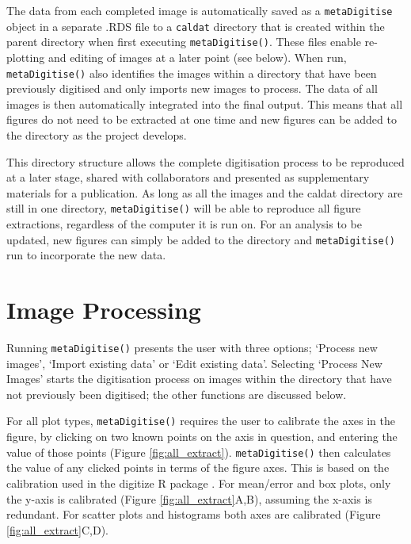 \documentclass[12pt]{article}
\newcommand{\code}[1]{\texttt{#1}}
\newcommand{\fct}[1]{\texttt{#1()}}
\newcommand{\pkg}[1]{{\fontseries{b}\selectfont #1}}
\begin{document}
The data from each completed image is automatically saved as a \code{metaDigitise} object in a separate .RDS file to a \code{caldat} directory that is created within the parent directory when first executing \fct{metaDigitise}. These files enable re-plotting and editing of images at a later point (see below). When run, \fct{metaDigitise} also identifies the images within a directory that have been previously digitised and only imports new images to process. The data of all images is then automatically integrated into the final output. This means that all figures do not need to be extracted at one time and new figures can be added to the directory as the project develops.

This directory structure allows the complete digitisation process to be reproduced at a later stage, shared with collaborators and presented as supplementary materials for a publication. As long as all the images and the caldat directory are still in one directory, \fct{metaDigitise} will be able to reproduce all figure extractions, regardless of the computer it is run on. For an analysis to be updated, new figures can simply be added to the directory and \fct{metaDigitise} run to incorporate the new data. 



\section{Image Processing}
Running \fct{metaDigitise} presents the user with three options; `Process new images', `Import existing data' or `Edit existing data'. Selecting `Process New Images' starts the digitisation process on images within the directory that have not previously been digitised; the other functions are discussed below.

For all plot types, \fct{metaDigitise} requires the user to calibrate the axes in the figure, by clicking on two known points on the axis in question, and entering the value of those points (Figure \ref{fig:all_extract}). \fct{metaDigitise} then calculates the value of any clicked points in terms of the figure axes. This is based on the calibration used in the \pkg{digitize} R package \citep{Poisot2011}. For mean/error and box plots, only the y-axis is calibrated (Figure \ref{fig:all_extract}A,B), assuming the x-axis is redundant. For scatter plots and histograms both axes are calibrated (Figure \ref{fig:all_extract}C,D).
\end{document}
